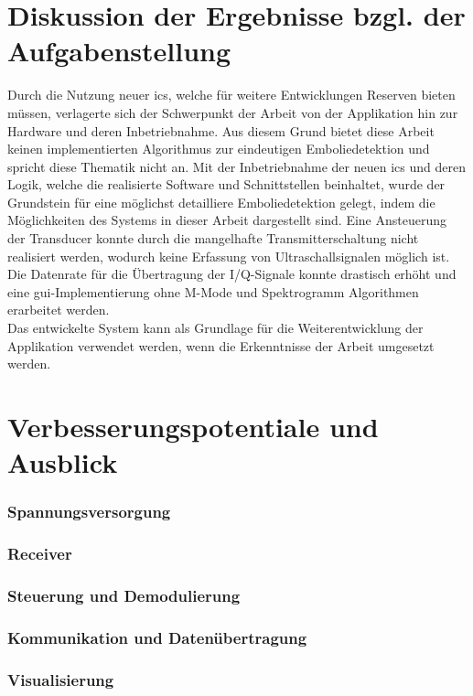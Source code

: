 \section{Diskussion der Ergebnisse bzgl. der Aufgabenstellung}\label{sec:discuss_tasks}
Durch die Nutzung neuer \ac{ic}s, welche für weitere Entwicklungen Reserven bieten müssen, verlagerte sich der Schwerpunkt der Arbeit von der Applikation hin zur Hardware und deren Inbetriebnahme. Aus diesem Grund bietet diese Arbeit keinen implementierten Algorithmus zur eindeutigen Emboliedetektion und spricht diese Thematik nicht an. Mit der Inbetriebnahme der neuen \acs{ic}s und deren Logik, welche die realisierte Software und Schnittstellen beinhaltet, wurde der Grundstein für eine möglichst detailliere Emboliedetektion gelegt, indem die Möglichkeiten des Systems in dieser Arbeit dargestellt sind. Eine Ansteuerung der Transducer konnte durch die mangelhafte Transmitterschaltung nicht realisiert werden, wodurch keine Erfassung von Ultraschallsignalen möglich ist. Die Datenrate für die Übertragung der I/Q-Signale konnte drastisch erhöht und eine \ac{gui}-Implementierung ohne M-Mode und Spektrogramm Algorithmen erarbeitet werden.\\
Das entwickelte System kann als Grundlage für die Weiterentwicklung der Applikation verwendet werden, wenn die Erkenntnisse der Arbeit umgesetzt werden.
\section{Verbesserungspotentiale und Ausblick}\label{sec:futurework}
\subsubsection{Spannungsversorgung}

\subsubsection{Receiver}
\subsubsection{Steuerung und Demodulierung}
\subsubsection{Kommunikation und Datenübertragung}
\subsubsection{Visualisierung}
%
%
%

